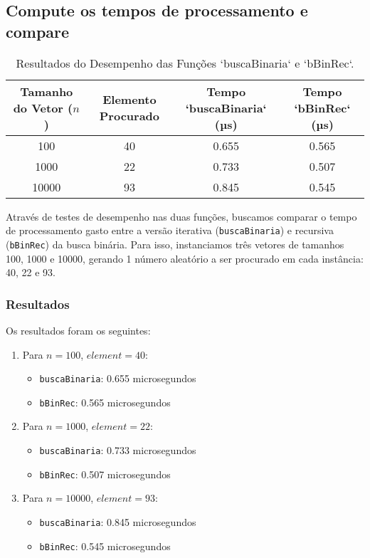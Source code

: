 \subsection{Compute os tempos de processamento e compare}

\begin{table}[ht]
    \centering
    \caption{Resultados do Desempenho das Funções `buscaBinaria` e `bBinRec`.}
    \begin{tabular}{@{}cccc@{}}
        \toprule
        Tamanho do Vetor (\(n\)) & Elemento Procurado & Tempo `buscaBinaria` (µs) & Tempo `bBinRec` (µs) \\ \midrule
        100       & 40 & 0.655               & 0.565               \\
        1000      & 22 & 0.733              & 0.507              \\
        10000     & 93 & 0.845             & 0.545               \\ \bottomrule
    \end{tabular}
\end{table}

Através de testes de desempenho nas duas funções, buscamos comparar o tempo de processamento gasto entre a versão iterativa (\texttt{buscaBinaria}) e recursiva (\texttt{bBinRec}) da busca binária. Para isso, instanciamos três vetores de tamanhos 100, 1000 e 10000, gerando 1 número aleatório a ser procurado em cada instância: 40, 22 e 93.

\subsubsection{Resultados}
Os resultados foram os seguintes:

\begin{enumerate}
    \item Para \( n = 100 \), \( element = 40 \):
    \begin{itemize}
        \item \texttt{buscaBinaria}: 0.655 microsegundos
        \item \texttt{bBinRec}: 0.565 microsegundos
    \end{itemize}

    \item Para \( n = 1000 \), \( element = 22 \):
    \begin{itemize}
        \item \texttt{buscaBinaria}: 0.733 microsegundos
        \item \texttt{bBinRec}: 0.507 microsegundos
    \end{itemize}

    \item Para \( n = 10000 \), \( element = 93 \):
    \begin{itemize}
        \item \texttt{buscaBinaria}: 0.845 microsegundos
        \item \texttt{bBinRec}: 0.545 microsegundos
    \end{itemize}
\end{enumerate}

